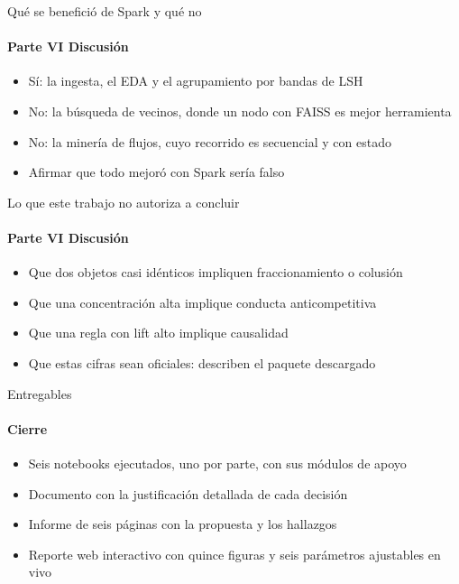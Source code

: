 \documentclass[aspectratio=169,10pt]{beamer}
\begin{document}
\begin{frame}{Qué se benefició de Spark y qué no}
  \framesubtitle{Parte VI \textperiodcentered{} Discusión}
  \begin{itemize}\setlength{\itemsep}{0.7em}
    \item Sí: la ingesta, el EDA y el agrupamiento por bandas de LSH
    \item No: la búsqueda de vecinos, donde un nodo con FAISS es mejor herramienta
    \item No: la minería de flujos, cuyo recorrido es secuencial y con estado
    \item Afirmar que todo mejoró con Spark sería falso
  \end{itemize}
\end{frame}

\begin{frame}{Lo que este trabajo no autoriza a concluir}
  \framesubtitle{Parte VI \textperiodcentered{} Discusión}
  \begin{itemize}\setlength{\itemsep}{0.7em}
    \item Que dos objetos casi idénticos impliquen fraccionamiento o colusión
    \item Que una concentración alta implique conducta anticompetitiva
    \item Que una regla con lift alto implique causalidad
    \item Que estas cifras sean oficiales: describen el paquete descargado
  \end{itemize}
\end{frame}

\begin{frame}{Entregables}
  \framesubtitle{Cierre}
  \begin{itemize}\setlength{\itemsep}{0.7em}
    \item Seis notebooks ejecutados, uno por parte, con sus módulos de apoyo
    \item Documento con la justificación detallada de cada decisión
    \item Informe de seis páginas con la propuesta y los hallazgos
    \item Reporte web interactivo con quince figuras y seis parámetros ajustables en vivo
  \end{itemize}
\end{frame}
\end{document}
